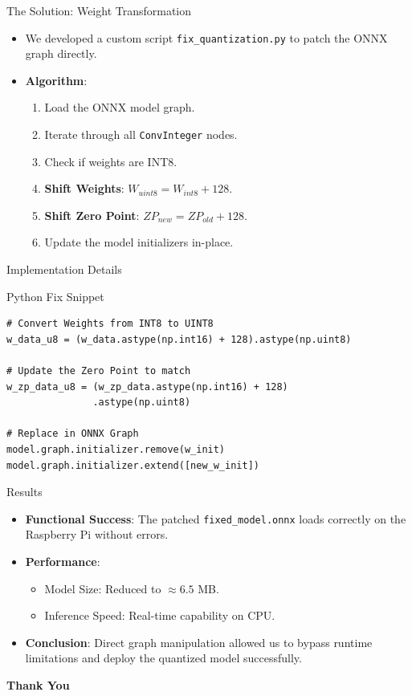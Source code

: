 \documentclass{beamer}
\begin{document}
\begin{frame}{The Solution: Weight Transformation}
    \begin{itemize}
        \item We developed a custom script \texttt{fix\_quantization.py} to patch the ONNX graph directly.
        \item \textbf{Algorithm}:
        \begin{enumerate}
            \item Load the ONNX model graph.
            \item Iterate through all \texttt{ConvInteger} nodes.
            \item Check if weights are INT8.
            \item \textbf{Shift Weights}: $W_{uint8} = W_{int8} + 128$.
            \item \textbf{Shift Zero Point}: $ZP_{new} = ZP_{old} + 128$.
            \item Update the model initializers in-place.
        \end{enumerate}
    \end{itemize}
\end{frame}

\begin{frame}[fragile]{Implementation Details}
    \begin{block}{Python Fix Snippet}
    \begin{verbatim}
# Convert Weights from INT8 to UINT8
w_data_u8 = (w_data.astype(np.int16) + 128).astype(np.uint8)

# Update the Zero Point to match
w_zp_data_u8 = (w_zp_data.astype(np.int16) + 128)
               .astype(np.uint8)

# Replace in ONNX Graph
model.graph.initializer.remove(w_init)
model.graph.initializer.extend([new_w_init])
    \end{verbatim}
    \end{block}
\end{frame}

\begin{frame}{Results}
    \begin{itemize}
        \item \textbf{Functional Success}: The patched \texttt{fixed\_model.onnx} loads correctly on the Raspberry Pi without errors.
        \item \textbf{Performance}:
        \begin{itemize}
            \item Model Size: Reduced to $\approx 6.5$ MB.
            \item Inference Speed: Real-time capability on CPU.
        \end{itemize}
        \item \textbf{Conclusion}: Direct graph manipulation allowed us to bypass runtime limitations and deploy the quantized model successfully.
    \end{itemize}
\end{frame}

\begin{frame}
    \centering \Huge \textbf{Thank You}
\end{frame}
\end{document}
